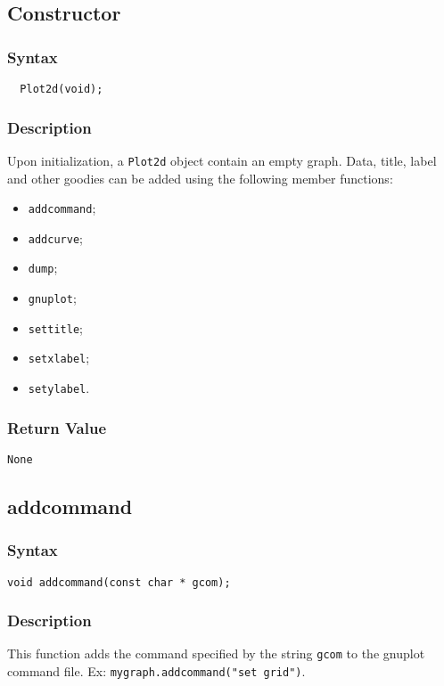 \documentclass[11pt,fleqn,letterpaper]{report}
\begin{document}
\subsection*{Constructor}
 \subsubsection*{Syntax}
 \begin{verbatim}
  Plot2d(void);
 \end{verbatim}

 \subsubsection*{Description}   
 Upon initialization, a {\tt Plot2d} object contain an empty graph.
 Data, title, label and other goodies can be added using the following
 member functions:
\begin{itemize}
\item {\tt addcommand};
\item {\tt addcurve};
\item {\tt dump};
\item {\tt gnuplot};
\item {\tt settitle};
\item {\tt setxlabel};
\item {\tt setylabel}.
\end{itemize}


\subsubsection*{Return Value}

{\tt None}
\newpage

\subsection*{addcommand}
\subsubsection*{Syntax}
\begin{verbatim}
void addcommand(const char * gcom);
\end{verbatim}
\subsubsection*{Description}
This function adds the command specified by the string {\tt gcom} to 
the \textsf{gnuplot} command file. Ex: {\tt mygraph.addcommand("set grid")}.
\end{document}
